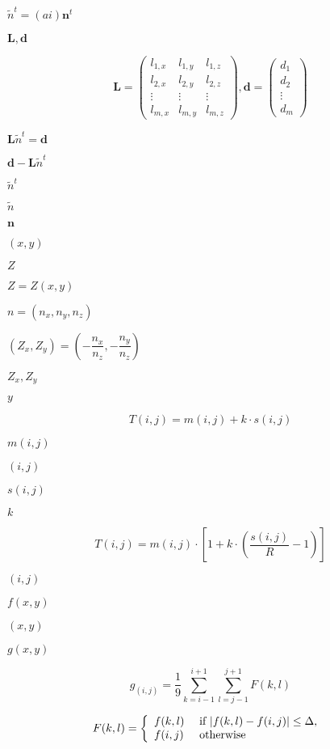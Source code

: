 \documentclass{article}
\begin{document}
$\tilde{n}^{t}=(ai)\bm{n}^{t}$
\pagebreak

$\textbf{L},\bm{d}$
\pagebreak

\[ \textbf{L}= \begin{pmatrix} l_{1,x} & l_{1,y} & l_{1,z} \\ l_{2,x} & l_{2,y} & l_{2,z} \\ \vdots & \vdots & \vdots \\ l_{m,x} & l_{m,y} & l_{m,z} \end{pmatrix}, \bm{d}=\begin{pmatrix}d_{1} \\ d_{2} \\ \vdots \\ d_{m} \end{pmatrix} \]
\pagebreak

$ \textbf{L}{\tilde{n}}^t=\bm{d} $
\pagebreak

$ \bm{d}-\textbf{L}\tilde{n}^t $
\pagebreak

$ \tilde{n}^t $
\pagebreak

$ \tilde{n} $
\pagebreak

$ \bm{n} $
\pagebreak

$ (x,y) $
\pagebreak

$ Z $
\pagebreak

$ Z=Z(x,y) $
\pagebreak

$ n=(n_{x},n_{y},n_{z}) $
\pagebreak

$ (Z_{x},Z_{y})=(-\dfrac{n_{x}}{n_{z}},-\dfrac{n_{y}}{n_{z}}) $
\pagebreak

$ Z_{x},Z_{y} $
\pagebreak

$ y $
\pagebreak

\[ T(i,j) = m(i,j) + k \cdot s(i,j) \]
\pagebreak

$m(i,j)$
\pagebreak

$(i,j)$
\pagebreak

$s(i,j)$
\pagebreak

$k$
\pagebreak

\[ T(i,j) = m(i,j) \cdot \left [ 1 + k \cdot \left (\frac { s(i,j) }{R} - 1 \right ) \right ] \]
\pagebreak

$(i, j)$
\pagebreak

$f(x, y)$
\pagebreak

$(x, y)$
\pagebreak

$g(x, y)$
\pagebreak

\[ g_{(i,j)} =\frac{1}{9} \sum^{i+1}_{k=i-1}\sum^{j+1}_{l=j-1} F(k,l) \]
\pagebreak

\[ F(k,l) = \left\{ \begin{array}{ll} f(k,l) & \mbox{ if $ \left| f(k,l) - f(i,j) \right| \leq \Delta $, } \\ f(i,j) & \mbox{ otherwise } \\ \end{array} \right. \]
\pagebreak
\end{document}
